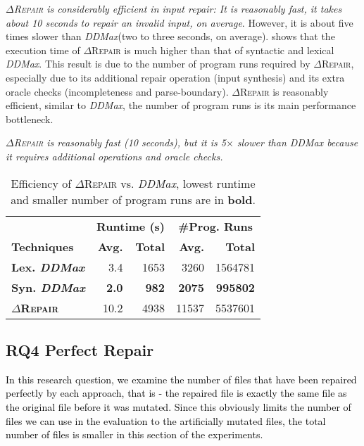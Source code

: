 \documentclass[acmsmall,screen,review,anonymous]{acmart}
\newenvironment{result}{\begin{framed}\centering\it}{\end{framed}}
\newcommand{\revise}[1]{\textcolor{black}{#1}}
\newcommand{\approach}{\textsc{$\Delta$Repair}\xspace}
\newcommand{\ddmax}{\textit{DDMax}\xspace}
\begin{document}
\textit{\approach is considerably efficient in input repair: It is reasonably fast, it takes about 10 seconds to repair an invalid input, on average}. However, it is about five times slower than \ddmax (two to three seconds, on average). 
shows %
that the execution time
of \approach %
is much higher %
than that of syntactic and lexical \ddmax. 
This result is %
due to the %
number of program runs required by \approach, especially due to its additional repair operation (input synthesis) and its extra oracle checks (incompleteness and parse-boundary).
\approach is reasonably efficient, similar to \ddmax, the number of program runs 
is its main performance bottleneck. %

\begin{result}
\approach is reasonably fast (10 seconds), but it 
is 5$\times$ slower than \ddmax because it requires
additional operations and oracle checks. 
\end{result}

\begin{table}[!tbp]\centering
\caption{Efficiency of \approach vs. \ddmax, lowest runtime and smaller number of program runs %
are in \textbf{bold}. %
}
\begin{tabular}{|l |  r  r | r  r |}
\hline
&  \multicolumn{2}{c|}{\textbf{Runtime (s)}} & \multicolumn{2}{c|}{\textbf{\#Prog. Runs}}  \\
\textbf{Techniques} %
&  \textbf{Avg.}  & \textbf{Total} & \textbf{Avg.}  & \textbf{Total} \\
\hline
\textbf{Lex. \ddmax} & 3.4 & 1653 & 3260 & 1564781 \\
\textbf{Syn. \ddmax} & \textbf{2.0} & \textbf{982}  & \textbf{2075}  & \textbf{995802}  \\
\hline
\textbf{\approach} &  10.2 & 4938  & 11537 & 5537601  \\
\hline
\end{tabular}
\label{tab:efficiency}
\end{table}

\subsection{RQ4 Perfect Repair}
\revise{In this research question, we examine the number of files that have been repaired perfectly by each approach, that is - the repaired file is exactly the same file as the original file before it was mutated.
Since this obviously limits the number of files we can use in the evaluation to the artificially mutated files, the total number of files is smaller in this section of the experiments.}
\end{document}
